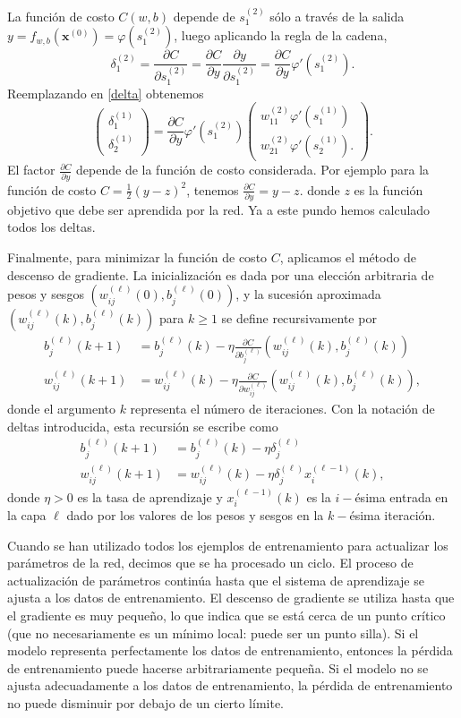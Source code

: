 \documentclass[12pt, a4paper]{amsbook}
\newcommand{\xx}{{\mathbf x}}
\theoremstyle{remark}
\theoremstyle{definition}
\numberwithin{section}{chapter}
\numberwithin{subsection}{section}
\numberwithin{equation}{section}
\numberwithin{figure}{chapter}
\begin{document}
La función de costo $C(w, b)$ depende de $s_1^{(2)}$ sólo a través de la salida $y=f_{w, b}(\xx^{(0)}) = \varphi(s_1^{(2)})$, luego aplicando la regla de la cadena,
$$
\delta_1^{(2)} = \frac{\partial C}{\partial s_1^{(2)}} = \frac{\partial C}{\partial y} \frac{\partial y}{\partial s_1^{(2)}} = \frac{\partial C}{\partial y}\varphi'(s_1^{(2)}).
$$
Reemplazando en \eqref{delta} obtenemos
$$
\begin{pmatrix}
\delta_1^{(1)} \\
\delta_2^{(1)}
\end{pmatrix} =  \frac{\partial C}{\partial y}\varphi'(s_1^{(2)})\begin{pmatrix}
w_{11}^{(2)}\varphi'(s_1^{(1)})\\
w_{21}^{(2)}\varphi'(s_2^{(1)}).
\end{pmatrix}.
$$
El factor $\frac{\partial C}{\partial y}$ depende de la función de costo considerada. Por ejemplo para la función de costo $C=\frac12(y-z)^2$, tenemos $\frac{\partial C}{\partial y}=y-z$. donde $z$ es la función objetivo que debe ser aprendida por la red. Ya a este pundo hemos calculado todos los deltas.

Finalmente, para minimizar la función de costo $C$, aplicamos el método de descenso de gradiente. La inicialización es dada por una elección arbitraria de pesos y sesgos $(w_{ij}^{(\ell)}(0), b_j^{(\ell)}(0))$, y la sucesión aproximada $(w_{ij}^{(\ell)}(k), b_j^{(\ell)}(k))$ para $k\ge 1$ se define recursivamente por
\begin{align*}
b_j^{(\ell)}(k+1) &= b_j^{(\ell)}(k) - \eta\frac{\partial C}{\partial b_j^{(\ell)}}(w_{ij}^{(\ell)}(k), b_j^{(\ell)}(k))\\
w_{ij}^{(\ell)}(k+1) &= w_{ij}^{(\ell)}(k) - \eta\frac{\partial C}{\partial w_{ij}^{(\ell)}}(w_{ij}^{(\ell)}(k), b_j^{(\ell)}(k)),
\end{align*}
donde el argumento $k$ representa el número de iteraciones. Con la notación de deltas introducida, esta recursión se escribe como
\begin{align*}
b_j^{(\ell)}(k+1) &= b_j^{(\ell)}(k) -\eta\delta_j^{(\ell)}\\
w_{ij}^{(\ell)}(k+1) &= w_{ij}^{(\ell)}(k) - \eta\delta_j^{(\ell)} x_i^{(\ell-1)}(k),
\end{align*}
donde $\eta>0$ es la tasa de aprendizaje y $x_i^{(\ell-1)}(k)$ es la $i-$ésima entrada en la capa $\ell$ dado por los valores de los pesos y sesgos en la $k-$ésima iteración.

Cuando se han utilizado todos los ejemplos de entrenamiento para actualizar los parámetros de la red, decimos que se ha procesado un ciclo. El proceso de actualización de parámetros continúa hasta que el sistema de aprendizaje se ajusta a los datos de entrenamiento. El descenso de gradiente se utiliza hasta que el gradiente es muy pequeño, lo que indica que se está cerca de un punto crítico (que no necesariamente es un mínimo local: puede ser un punto silla). Si el modelo representa perfectamente los datos de entrenamiento, entonces la pérdida de entrenamiento puede hacerse arbitrariamente pequeña. Si el modelo no se ajusta adecuadamente a los datos de entrenamiento, la pérdida de entrenamiento no puede disminuir por debajo de un cierto límite.
\end{document}
